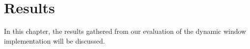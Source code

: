 \chapter{Results}%
\label{chap:Results}

In this chapter, the results gathered from our evaluation of the dynamic window 
implementation will be discussed. 



